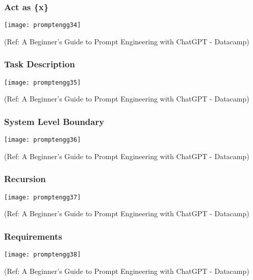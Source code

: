 \begin{frame}[fragile]\frametitle{Act as \{x\}}


\begin{center}
\texttt{[image: promptengg34]}

{\tiny (Ref: A Beginner's Guide to Prompt Engineering with ChatGPT - Datacamp)}
\end{center}		
		

\end{frame}

\begin{frame}[fragile]\frametitle{Task Description}


\begin{center}
\texttt{[image: promptengg35]}

{\tiny (Ref: A Beginner's Guide to Prompt Engineering with ChatGPT - Datacamp)}
\end{center}		
		

\end{frame}

\begin{frame}[fragile]\frametitle{System Level Boundary}


\begin{center}
\texttt{[image: promptengg36]}

{\tiny (Ref: A Beginner's Guide to Prompt Engineering with ChatGPT - Datacamp)}
\end{center}		
		

\end{frame}

\begin{frame}[fragile]\frametitle{Recursion}


\begin{center}
\texttt{[image: promptengg37]}

{\tiny (Ref: A Beginner's Guide to Prompt Engineering with ChatGPT - Datacamp)}
\end{center}		
		

\end{frame}

\begin{frame}[fragile]\frametitle{Requirements}


\begin{center}
\texttt{[image: promptengg38]}

{\tiny (Ref: A Beginner's Guide to Prompt Engineering with ChatGPT - Datacamp)}
\end{center}		
		

\end{frame}

